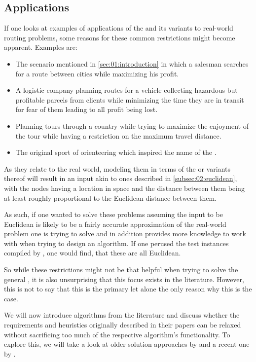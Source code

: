 \subsection{Applications}
\label{subsec:02:reasons}

If one looks at examples of applications of the \oplong and its variants to real-world routing problems,
some reasons for these common restrictions might become apparent. Examples are:
\begin{itemize}
	\item The scenario mentioned in \cref{sec:01:introduction} in which a salesman searches for a route between cities while maximizing his profit. \cite{chao_fast_1996}
	\item A logistic company planning routes for a vehicle collecting hazardous but profitable parcels from clients while minimizing the time they are in transit for fear of them leading to all profit being lost. \cite{santini_hazardous_2022}
	\item Planning tours through a country while trying to maximize the enjoyment of the tour while having a restriction on the maximum travel distance. \cite{geem_harmony_2005}
	\item The original sport of orienteering which inspired the name of the \op. \cite{tsiligiridis_heuristic_1984}
\end{itemize}

As they relate to the real world, modeling them in terms of the \op or variants thereof
will result in an input akin to ones described in \cref{subsec:02:euclidean},
with the nodes having a location in space and the distance between them being at least roughly proportional to the Euclidean distance between them.

As such, if one wanted to solve these problems assuming the input to be Euclidean is likely to be a fairly accurate approximation of the real-world problem one is trying to solve and in addition provides more knowledge to work with when trying to design an algorithm.
If one perused the test instances compiled by \citeauthor{vansteenwegen_orienteering_2011} \cite{vansteenwegen_orienteering_2011},
one would find, that these are all Euclidean.

So while these restrictions might not be that helpful when trying to solve the general \op, it is also unsurprising that this focus exists in the literature.
However, this is not to say that this is the primary let alone the only reason why this is the case.

We will now introduce algorithms from the literature and discuss
whether the requirements and heuristics originally described in their papers can be relaxed without sacrificing too much of the respective algorithm's functionality.
To explore this, we will take a look at older solution approaches by \citeauthor{tsiligiridis_heuristic_1984} \cite{tsiligiridis_heuristic_1984} and a recent one by \citeauthor{szwarc_novel_2022}. \cite{szwarc_novel_2022}
